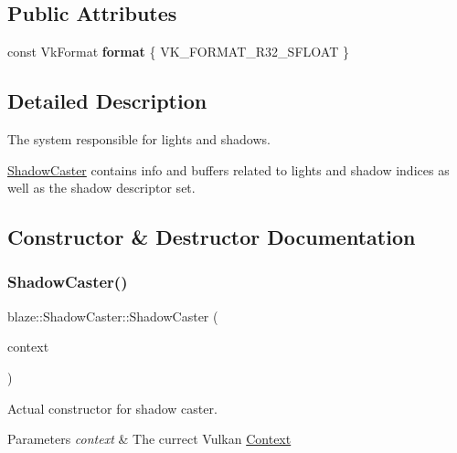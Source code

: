 \subsection*{Public Attributes}
\begin{DoxyCompactItemize}
\item 
\mbox{\label{classblaze_1_1ShadowCaster_a787a79c9965b60af9b6eea7677901c11}} 
const Vk\+Format {\bfseries format} \{ V\+K\+\_\+\+F\+O\+R\+M\+A\+T\+\_\+\+R32\+\_\+\+S\+F\+L\+O\+AT \}
\end{DoxyCompactItemize}


\subsection{Detailed Description}
The system responsible for lights and shadows. 

\hyperlink{classblaze_1_1ShadowCaster}{Shadow\+Caster} contains info and buffers related to lights and shadow indices as well as the shadow descriptor set. 

\subsection{Constructor \& Destructor Documentation}
\mbox{\label{classblaze_1_1ShadowCaster_a56725d8747bed3ddabde77979896194d}} 
\subsubsection{\texorpdfstring{Shadow\+Caster()}{ShadowCaster()}}
{\footnotesize\ttfamily blaze\+::\+Shadow\+Caster\+::\+Shadow\+Caster (\begin{DoxyParamCaption}\item[{const \hyperlink{classblaze_1_1Context}{Context} \&}]{context }\end{DoxyParamCaption})\hspace{0.3cm}{\ttfamily [noexcept]}}



Actual constructor for shadow caster. 


\begin{DoxyParams}{Parameters}
{\em context} & The currect Vulkan \hyperlink{classblaze_1_1Context}{Context} \\
\hline
\end{DoxyParams}


